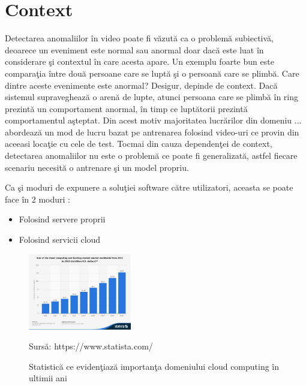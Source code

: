 \documentclass[a4paper,12pt]{report}
\newcommand{\source}[1]{\caption*{Sursă: {#1}} }
\begin{document}
\section{Context}
\quad Detectarea anomaliilor în video poate fi văzută ca o problemă subiectivă, deoarece un eveniment este normal sau anormal doar dacă este luat în considerare şi contextul în care acesta apare. Un exemplu foarte bun este comparaţia între două persoane care se luptă şi o persoană care se plimbă. Care dintre aceste evenimente este anormal? Desigur, depinde de context. Dacă sistemul supraveghează o arenă de lupte, atunci persoana care se plimbă în ring prezintă un comportament anormal, în timp ce luptătorii prezintă comportamentul aşteptat. Din acest motiv majoritatea lucrărilor din domeniu \cite{cheng2015,ionescu2019object,sultani2018}...  abordează un mod de lucru bazat pe antrenarea folosind video-uri ce provin din aceeasi locaţie cu cele de test. Tocmai din cauza dependenţei de context, detectarea anomaliilor nu este o problemă ce poate fi generalizată, astfel fiecare scenariu necesită o antrenare şi un model propriu. \par

Ca şi moduri de expunere a soluţiei software către utilizatori, aceasta se poate face în 2 moduri :
\begin{itemize}
\item Folosind servere proprii
\item Folosind servicii cloud
\end{itemize}
\par

\begin{figure}
	  \begin{center}
        \includegraphics[width=0.4\textwidth]{images/grafic_cloud_computing}
       \caption{Statistică ce evidenţiază importanţa domeniului cloud computing în ultimii ani}
			\label{fig:cloud_computing_graph}
       \source {https://www.statista.com/}
    \end{center}
\end{figure}
\end{document}
